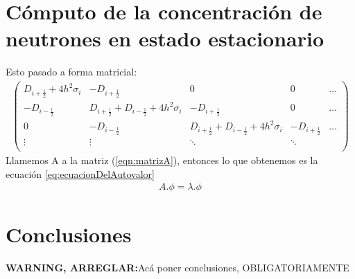 \documentclass[11pt,a4paper]{emulateapj}
\def \warn {{\sffamily\bfseries\large WARNING, ARREGLAR:}}
\begin{document}
\section{Cómputo de la concentración de neutrones en estado estacionario}
\label{sec:computo}
Esto pasado a forma matricial:
\begin{eqnarray}
\label{eqn:matrizA}
	 \left( \begin{array}{ccccc}
		D_{i+\frac{1}{2}} + 4h^2\sigma_i & -D_{i+\frac{1}{2}}  					& 0 		& 0 & \dots \\
		-D_{i-\frac{1}{2}} 		& D_{i+\frac{1}{2}} + D_{i-\frac{1}{2}} + 4h^2\sigma_i 	& -D_{i+\frac{1}{2}} & 0 & \dots \\
		0 & -D_{i-\frac{1}{2}}& D_{i+\frac{1}{2}} + D_{i-\frac{1}{2}} + 4h^2\sigma_i & -D_{i+\frac{1}{2}}  & \dots\\
		\vdots &\vdots&\ddots&\ddots&\\
		\end{array} 
	\right)
\end{eqnarray}
Llamemos A a la matriz (\ref{eqn:matrizA}), entonces lo que obtenemos es la ecuación \ref{eq:ecuacionDelAutovalor}
\begin{eqnarray}
\label{eq:ecuacionDelAutovalor}
A . \phi = \lambda . \phi
\end{eqnarray}

\section{Conclusiones}
\label{sec:conclusiones}
\warn Acá poner conclusiones, OBLIGATORIAMENTE
%
%

\end{document}
